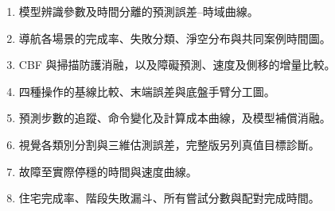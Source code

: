 \begin{enumerate}
    \item 模型辨識參數及時間分離的預測誤差--時域曲線。
    \item 導航各場景的完成率、失敗分類、淨空分布與共同案例時間圖。
    \item CBF 與掃描防護消融，以及障礙預測、速度及側移的增量比較。
    \item 四種操作的基線比較、末端誤差與底盤手臂分工圖。
    \item 預測步數的追蹤、命令變化及計算成本曲線，及模型補償消融。
    \item 視覺各類別分割與三維估測誤差，完整版另列真值目標診斷。
    \item 故障至實際停穩的時間與速度曲線。
    \item 住宅完成率、階段失敗漏斗、所有嘗試分數與配對完成時間。
\end{enumerate}
